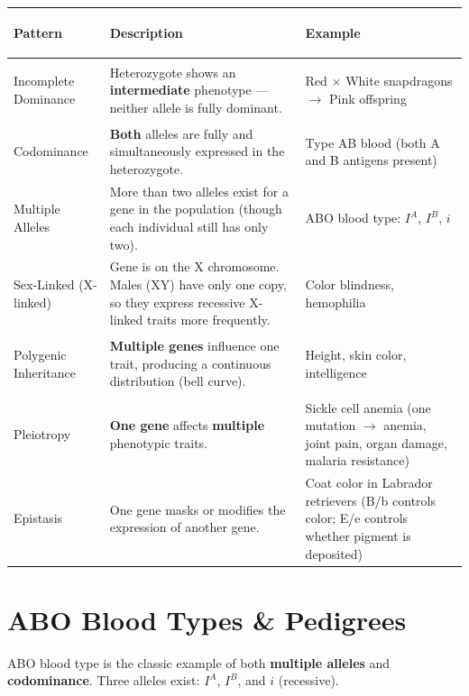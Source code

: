 \documentclass[11pt, letterpaper]{article}
\begin{document}
\noindent
{\renewcommand{\arraystretch}{1.6}
\begin{tabularx}{\textwidth}{>{\bfseries\raggedright\arraybackslash}p{4cm}
                              >{\raggedright\arraybackslash}X
                              >{\raggedright\arraybackslash}p{3.5cm}}
\toprule
\rowcolor{tableheaderpurple}
\textbf{Pattern} & \textbf{Description} & \textbf{Example} \\
\midrule
\rowcolor{rowPu} Incomplete Dominance & Heterozygote shows an \textbf{intermediate} phenotype --- neither allele is fully dominant. & Red $\times$ White snapdragons $\to$ Pink offspring \\
\rowcolor{rowA}  Codominance & \textbf{Both} alleles are fully and simultaneously expressed in the heterozygote. & Type AB blood (both A and B antigens present) \\
\rowcolor{rowPu} Multiple Alleles & More than two alleles exist for a gene in the population (though each individual still has only two). & ABO blood type: $I^A$, $I^B$, $i$ \\
\rowcolor{rowA}  Sex-Linked (X-linked) & Gene is on the X chromosome. Males (XY) have only one copy, so they express recessive X-linked traits more frequently. & Color blindness, hemophilia \\
\rowcolor{rowPu} Polygenic Inheritance & \textbf{Multiple genes} influence one trait, producing a continuous distribution (bell curve). & Height, skin color, intelligence \\
\rowcolor{rowA}  Pleiotropy & \textbf{One gene} affects \textbf{multiple} phenotypic traits. & Sickle cell anemia (one mutation $\to$ anemia, joint pain, organ damage, malaria resistance) \\
\rowcolor{rowPu} Epistasis & One gene masks or modifies the expression of another gene. & Coat color in Labrador retrievers (B/b controls color; E/e controls whether pigment is deposited) \\
\bottomrule
\end{tabularx}}

\section*{ABO Blood Types \& Pedigrees}

ABO blood type is the classic example of both \textbf{multiple alleles} and
\textbf{codominance}. Three alleles exist: $I^A$, $I^B$, and $i$ (recessive).
\end{document}
